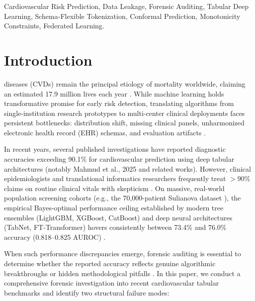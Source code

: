 \documentclass[journal]{IEEEtran}
\begin{document}
\begin{IEEEkeywords}
Cardiovascular Risk Prediction, Data Leakage, Forensic Auditing, Tabular Deep Learning, Schema-Flexible Tokenization, Conformal Prediction, Monotonicity Constraints, Federated Learning.
\end{IEEEkeywords}

\section{Introduction}
 diseases (CVDs) remain the principal etiology of mortality worldwide, claiming an estimated 17.9 million lives each year \cite{who2021}. While machine learning holds transformative promise for early risk detection, translating algorithms from single-institution research prototypes to multi-center clinical deployments faces persistent bottlenecks: distribution shift, missing clinical panels, unharmonized electronic health record (EHR) schemas, and evaluation artifacts \cite{collins2024}.

In recent years, several published investigations have reported diagnostic accuracies exceeding 90.1\% for cardiovascular prediction using deep tabular architectures (notably Mahmud et al., 2025 \cite{mahmud2025} and related works). However, clinical epidemiologists and translational informatics researchers frequently treat $>90\%$ claims on routine clinical vitals with skepticism \cite{kapoor2023}. On massive, real-world population screening cohorts (e.g., the 70,000-patient Sulianova dataset \cite{mahmud2025}), the empirical Bayes-optimal performance ceiling established by modern tree ensembles (LightGBM, XGBoost, CatBoost) and deep neural architectures (TabNet, FT-Transformer) hovers consistently between 73.4\% and 76.0\% accuracy (0.818--0.825 AUROC) \cite{gorishniy2021, arik2021}.

When such performance discrepancies emerge, forensic auditing is essential to determine whether the reported accuracy reflects genuine algorithmic breakthroughs or hidden methodological pitfalls \cite{barz2020}. In this paper, we conduct a comprehensive forensic investigation into recent cardiovascular tabular benchmarks and identify two structural failure modes:
\end{document}
